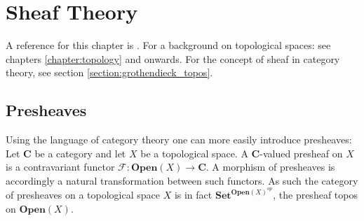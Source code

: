 \chapter{Sheaf Theory}\label{chapter:sheaf}

    A reference for this chapter is \cite{brylinski}. For a background on topological spaces: see chapters \ref{chapter:topology} and onwards. For the concept of sheaf in category theory, see section \ref{section:grothendieck_topos}.

\section{Presheaves}



    \begin{adefinition}
        Using the language of category theory one can more easily introduce presheaves: Let $\mathbf{C}$ be a category and let $X$ be a topological space. A $\mathbf{C}$-valued presheaf on $X$ is a contravariant functor $\mathcal{F}:\mathbf{Open}(X)\rightarrow\mathbf{C}$. A morphism of presheaves is accordingly a natural transformation between such functors. As such the category of presheaves on a topological space $X$ is in fact $\mathbf{Set}^{\mathbf{Open}(X)^{op}}$, the presheaf topos on $\mathbf{Open}(X)$.
    \end{adefinition}

